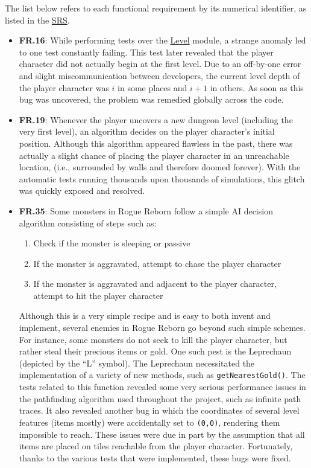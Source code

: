 \documentclass[12pt, titlepage]{article}
\begin{document}
	The list below refers to each functional requirement by its numerical identifier, as listed in the \href{run:../SRS/SRS.pdf}{SRS}.

	\begin{itemize}
		\item[] \textbf{FR.16}: While performing tests over the \hyperref[Section_M_Trace]{Level} module, a strange anomaly led to one test constantly failing.  This test later revealed that the player character did not actually begin at the first level.  Due to an off-by-one error and slight miscommunication between developers, the current level depth of the player character was $i$ in some places and $i+1$ in others. As soon as this bug was uncovered, the problem was remedied globally across the code.

		\item[] \textbf{FR.19}: Whenever the player uncovers a new dungeon level (including the very first level), an algorithm decides on the player character's initial position.  Although this algorithm appeared flawless in the past, there was actually a slight chance of placing the player character in an unreachable location, (i.e., surrounded by walls and therefore doomed forever).  With the automatic tests running thousands upon thousands of simulations, this glitch was quickly exposed and resolved.

		\item[] \textbf{FR.35}: Some monsters in Rogue Reborn follow a simple AI decision algorithm consisting of steps such as:
		\begin{enumerate}
			\item Check if the monster is sleeping or passive 
			\item If the monster is aggravated, attempt to chase the player character
			\item If the monster is aggravated and adjacent to the player character, attempt to hit the player character
		\end{enumerate}
		Although this is a very simple recipe and is easy to both invent and implement, several enemies in Rogue Reborn go beyond such simple schemes.  For instance, some monsters do not seek to kill the player character, but rather steal their precious items or gold.  One such pest is the Leprechaun (depicted by the ``L'' symbol).  The Leprechaun necessitated the implementation of a variety of new methods, such as \lstinline$getNearestGold()$.  The tests related to this function revealed some very serious performance issues in the pathfinding algorithm used throughout the project, such as infinite path traces.  It also revealed another bug in which the coordinates of several level features (items mostly) were accidentally set to \lstinline$(0,0)$, rendering them impossible to reach.  These issues were due in part by the assumption that all items are placed on tiles reachable from the player character.  Fortunately, thanks to the various tests that were implemented, these bugs were fixed.


\end{itemize}
\end{document}

